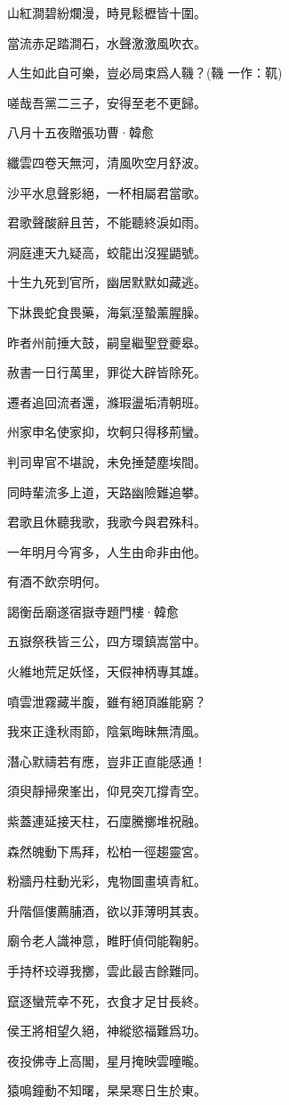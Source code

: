 \documentclass[12pt,a4paper]{ctexbook}
\begin{document}
山紅澗碧紛爛漫，時見鬆櫪皆十圍。\par
當流赤足踏澗石，水聲激激風吹衣。\par
人生如此自可樂，豈必局束爲人鞿？(鞿 一作：靰)\par
嗟哉吾黨二三子，安得至老不更歸。\par
八月十五夜贈張功曹·韓愈\par
纖雲四卷天無河，清風吹空月舒波。\par
沙平水息聲影絕，一杯相屬君當歌。\par
君歌聲酸辭且苦，不能聽終淚如雨。\par
洞庭連天九疑高，蛟龍出沒猩鼯號。\par
十生九死到官所，幽居默默如藏逃。\par
下牀畏蛇食畏藥，海氣溼蟄薰腥臊。\par
昨者州前捶大鼓，嗣皇繼聖登夔皋。\par
赦書一日行萬里，罪從大辟皆除死。\par
遷者追回流者還，滌瑕盪垢清朝班。\par
州家申名使家抑，坎軻只得移荊蠻。\par
判司卑官不堪說，未免捶楚塵埃間。\par
同時輩流多上道，天路幽險難追攀。\par
君歌且休聽我歌，我歌今與君殊科。\par
一年明月今宵多，人生由命非由他。\par
有酒不飲奈明何。\par
謁衡岳廟遂宿嶽寺題門樓·韓愈\par
五嶽祭秩皆三公，四方環鎮嵩當中。\par
火維地荒足妖怪，天假神柄專其雄。\par
噴雲泄霧藏半腹，雖有絕頂誰能窮？\par
我來正逢秋雨節，陰氣晦昧無清風。\par
潛心默禱若有應，豈非正直能感通！\par
須臾靜掃衆峯出，仰見突兀撐青空。\par
紫蓋連延接天柱，石廩騰擲堆祝融。\par
森然魄動下馬拜，松柏一徑趨靈宮。\par
粉牆丹柱動光彩，鬼物圖畫填青紅。\par
升階傴僂薦脯酒，欲以菲薄明其衷。\par
廟令老人識神意，睢盱偵伺能鞠躬。\par
手持杯珓導我擲，雲此最吉餘難同。\par
竄逐蠻荒幸不死，衣食才足甘長終。\par
侯王將相望久絕，神縱慾福難爲功。\par
夜投佛寺上高閣，星月掩映雲曈曨。\par
猿鳴鐘動不知曙，杲杲寒日生於東。\par
\end{document}
